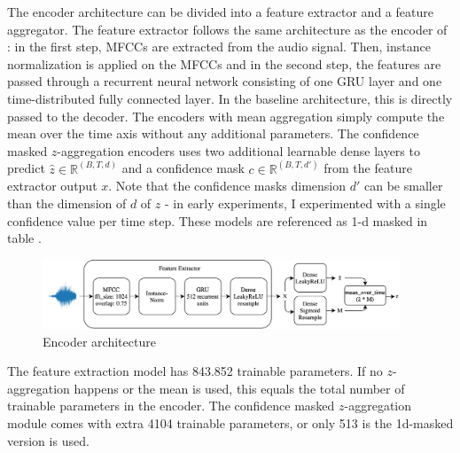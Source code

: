 \begin{theappendices}
The encoder architecture can be divided into a feature extractor and a feature aggregator.
The feature extractor follows the same architecture as the encoder of \citep{ddsp}: in the first step, MFCCs are extracted from the audio signal. Then, instance normalization is applied on the MFCCs and in the second step, the features are passed through a recurrent neural network consisting of one GRU layer and one time-distributed fully connected layer.
In the baseline architecture, this is directly passed to the decoder.
The encoders with mean aggregation simply compute the mean over the time axis without any additional parameters.
The confidence masked $z$-aggregation encoders uses two additional learnable dense layers to predict $\hat{z} \in \mathbb{R}^{(B, T, d)}$ and a confidence mask $c \in \mathbb{R}^{(B, T, d')}$ from the feature extractor output $x$.
Note that the confidence masks dimension $d'$ can be smaller than the dimension of $d$ of $z$ - in early experiments, I experimented with a single confidence value per time step. These models are referenced as 1-d masked in table . \newline
\begin{figure}
    \includegraphics[width=0.95\textwidth]{figures/encoder2.png}
    \caption{Encoder architecture}
    \label{fig:encoder}
\end{figure}
The feature extraction model has 843.852 trainable parameters. If no $z$-aggregation happens or the mean is used, this equals the total number of trainable parameters in the encoder. The confidence masked $z$-aggregation module comes with extra 4104 trainable parameters, or only 513 is the 1d-masked version is used.






\end{theappendices}
